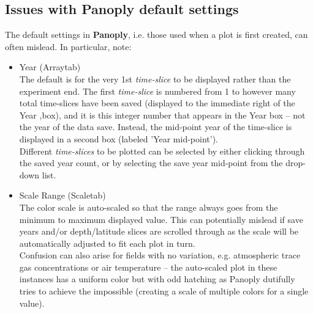 \documentclass[11pt,fleqn]{book} %
\begin{document}

\subsection{Issues with Panoply default settings}

The default settings in \textbf{Panoply}, i.e. those used when a plot is first created, can often mislead. In particular, note:
\begin{itemize}

\vspace{1mm}
\item \footnotesize\textsf{Year }\normalsize (\footnotesize\textsf{Array}\normalsize tab)
        \\ The default is for the very 1st \textit{time-slice} to be displayed rather than the experiment end. The first \textit{time-slice} is numbered from 1 to however many total time-slices have been saved (displayed to the immediate right of the \footnotesize\textsf{Year ,}\normalsize box), and it is this integer number that appears in the \footnotesize\textsf{Year }\normalsize box -- not the year of the data save. Instead, the mid-point year of the time-slice is displayed in a second box (labeled '\footnotesize\textsf{Year mid-point}\normalsize').
        \\ Different \textit{time-slices} to be plotted can be selected by either clicking through the saved year count, or by selecting the save year mid-point from the drop-down list.

\vspace{1mm}
\item \footnotesize\textsf{Scale Range }\normalsize (\footnotesize\textsf{Scale}\normalsize tab)
        \\ The color scale is auto-scaled so that the range always goes from the minimum to maximum displayed value. This can potentially mislead if save years and/or depth/latitude slices are scrolled through as the scale will be automatically adjusted to fit each plot in turn.
        \\ Confusion can also arise for fields with no variation, e.g. atmospheric trace gas concentrations or air temperature -- the auto-scaled plot in these instances has a uniform color but with odd hatching as Panoply dutifully tries to achieve the impossible (creating a scale of multiple colors for a single value).


\end{itemize}
\end{document}
